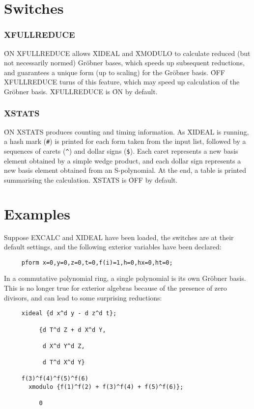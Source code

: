 \section{Switches} 

\subsubsection*{XFULLREDUCE}

\f{ON XFULLREDUCE} allows \f{XIDEAL} and
\f{XMODULO} to calculate reduced (but not necessarily normed)
Gr\"obner bases, which speeds up subsequent reductions, and guarantees
a unique form (up to scaling) for the Gr\"obner basis.  \f{OFF
XFULLREDUCE} turns of this feature, which may speed up calculation of
the Gr\"obner basis.  \f{XFULLREDUCE} is \f{ON} by default. 


\subsubsection*{XSTATS}

\f{ON XSTATS} produces counting and timing
information.  As \f{XIDEAL} is running, a hash mark (\verb.#.) is
printed for each form taken from the input list, followed by a
sequences of carets (\verb.^.) and dollar signs (\verb.$.). Each caret
represents a new basis element obtained by a simple wedge product, and
each dollar sign represents a new basis element obtained from an
S-polynomial.  At the end, a table is printed summarising the
calculation.  \f{XSTATS} is \f{OFF} by default. 

\section{Examples}

Suppose EXCALC and XIDEAL have been loaded, the switches are at their
default settings, and the following exterior variables have been declared:

\begin{verbatim}
     pform x=0,y=0,z=0,t=0,f(i)=1,h=0,hx=0,ht=0;
\end{verbatim}

In a commutative polynomial ring, a single polynomial is its own Gr\"obner
basis.  This is no longer true for exterior algebras because of the presence
of zero divisors, and can lead to some surprising reductions:
\begin{verbatim}
     xideal {d x^d y - d z^d t};

          {d T^d Z + d X^d Y,

           d X^d Y^d Z,

           d T^d X^d Y}

     f(3)^f(4)^f(5)^f(6) 
       xmodulo {f(1)^f(2) + f(3)^f(4) + f(5)^f(6)};

          0
\end{verbatim}

